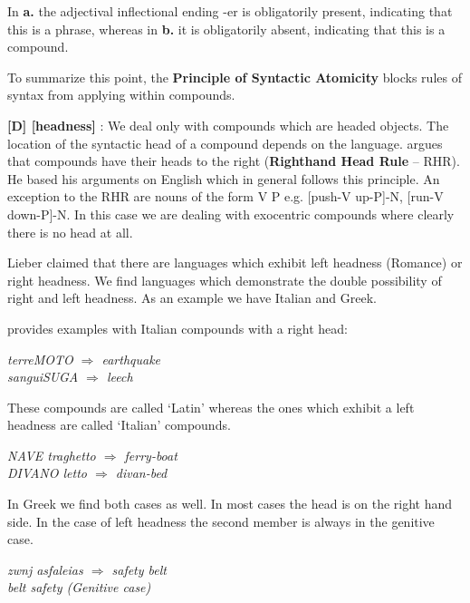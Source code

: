 In  {\bf a.}  the adjectival inflectional ending  -er  is  obligatorily 
present,  indicating  that this is a phrase,  whereas in {\bf b.} it is 
obligatorily absent, indicating that this is a compound.

To summarize this point, the {\bf Principle  of  Syntactic Atomicity} 
blocks rules of syntax from applying within compounds.

 
{\bf [D] [headness]} :
We  deal  only  with  compounds which  are  headed  objects.  The 
location  of  the  syntactic head of a compound  depends  on  the 
language. \cite{Williams81a} argues that compounds have their heads 
to  the  right  ({\bf Righthand  Head  Rule}   -- RHR).  He  based  his 
arguments on English which in general follows this principle.  An 
exception  to  the  RHR are nouns of the form V P  e.g.  [push-V 
up-P]-N, [run-V down-P]-N. In this case we are dealing with exocentric 
compounds where clearly there is no head at all. 

Lieber  claimed  that  there are  languages  which  exhibit  left 
headness  (Romance)  or right headness.  We find languages  which 
demonstrate the double possibility of right and left headness. As 
an example we have Italian and Greek.

 provides examples with Italian compounds with 
a right head:
\begin{center}
{\em terreMOTO  $\Rightarrow$ earthquake\\
 sanguiSUGA $\Rightarrow$  leech\\}
\end{center} 

These compounds are called `Latin' whereas the ones which exhibit 
a left headness are called `Italian' compounds.

\begin{center}

{\em  NAVE traghetto $\Rightarrow$  ferry-boat\\
 DIVANO letto   $\Rightarrow$  divan-bed\\}
\end{center}


In Greek we find both cases as well. In most cases the head is on 
the  right  hand side.  In the case of left headness  the  second 
member is always in the genitive case.

\begin{center}
{\em  zwnj asfaleias $\Rightarrow$ safety belt\\
 belt safety (Genitive case)}

\end{center}


